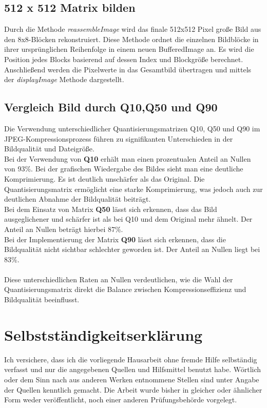 \documentclass[12pt]{article}
\begin{document}
	\subsection{512 x 512 Matrix bilden}	
Durch die Methode \textit{reassembleImage} wird das finale 512x512 Pixel große Bild aus den 8x8-Blöcken rekonstruiert. Diese Methode ordnet die einzelnen Bildblöcke in ihrer ursprünglichen Reihenfolge in einem neuen BufferedImage an. Es wird die Position jedes Blocks basierend auf dessen Index und Blockgröße berechnet. Anschließend werden die Pixelwerte in das Gesamtbild übertragen und mittels der \textit{displayImage} Methode dargestellt.
		
\newpage

\subsection{Vergleich Bild durch Q10,Q50 und Q90}

Die Verwendung unterschiedlicher Quantisierungsmatrizen Q10, Q50 und Q90 im JPEG-Kompressionsprozess führen zu signifikanten Unterschieden in der Bildqualität und Dateigröße. \\
Bei der Verwendung von \textbf{Q10} erhält man einen prozentualen Anteil an Nullen von 93\%. Bei der grafischen Wiedergabe des Bildes sieht man eine deutliche Komprimierung. Es ist deutlich unschärfer als das Original. Die Quantisierungsmatrix ermöglicht eine starke Komprimierung, was jedoch auch zur deutlichen Abnahme der Bildqualität beiträgt. \\
Bei dem Einsatz von Matrix \textbf{Q50} lässt sich erkennen, dass das Bild ausgeglichener und schärfer ist als bei Q10 und dem Original mehr ähnelt. Der Anteil an Nullen beträgt hierbei 87\%. \\
Bei der Implementierung der Matrix \textbf{Q90} lässt sich erkennen, dass die Bildqualität nicht sichtbar schlechter geworden ist. Der Anteil an Nullen liegt bei 83\%. \\\\
Diese unterschiedlichen Raten an Nullen verdeutlichen, wie die Wahl der Quantisierungsmatrix direkt die Balance zwischen Kompressionseffizienz und Bildqualität beeinflusst.

\newpage
		
		\section{Selbstständigkeitserklärung}
		Ich versichere, dass ich die vorliegende Hausarbeit ohne
		fremde Hilfe selbständig verfasst und nur die angegebenen Quellen und Hilfsmittel
		benutzt habe. Wörtlich oder dem Sinn nach aus anderen Werken entnommene Stellen
		sind unter Angabe der Quellen kenntlich gemacht. Die Arbeit wurde bisher in gleicher
		oder ähnlicher Form weder veröffentlicht, noch einer anderen Prüfungsbehörde
		vorgelegt. 
		\vspace{16cm}
		
\end{document}
